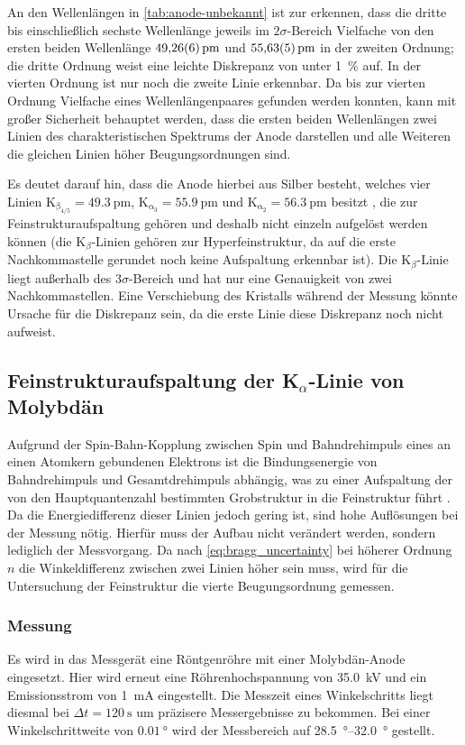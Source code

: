 An den Wellenlängen in \cref{tab:anode-unbekannt} ist zur erkennen, dass die dritte bis einschließlich 
sechste Wellenlänge jeweils im $2\sigma$-Bereich Vielfache von den ersten beiden Wellenlänge $\SI{49.26\pm 0.06}{\pm}$
und $\SI{55.63\pm 0.05}{\pm}$ in der zweiten Ordnung; die dritte Ordnung weist eine leichte Diskrepanz von 
unter \SI{1}{\percent} auf. In der vierten Ordnung ist nur noch die zweite Linie erkennbar. Da bis zur vierten 
Ordnung Vielfache eines Wellenlängenpaares gefunden werden konnten, kann mit großer Sicherheit 
behauptet werden, dass die ersten beiden Wellenlängen zwei Linien des charakteristischen Spektrums 
der Anode darstellen und alle Weiteren die gleichen Linien höher Beugungsordnungen sind.\par
Es deutet darauf hin, dass die Anode hierbei aus Silber besteht, welches 
vier Linien K$_\mathrm{\beta_{4/5}} = \SI{49.3}{\pm}$,  K$_\mathrm{\alpha_3}=\SI{55.9}{\pm}$
und K$_\mathrm{\alpha_2}=\SI{56.3}{\pm}$ besitzt \cite{nist_xray_database}, die zur Feinstrukturaufspaltung gehören und 
deshalb nicht einzeln aufgelöst werden können (die K$_\beta$-Linien gehören zur 
Hyperfeinstruktur, da auf die erste Nachkommastelle gerundet noch keine 
Aufspaltung erkennbar ist). Die K$_\beta$-Linie liegt außerhalb des $3\sigma$-Bereich und hat nur 
eine Genauigkeit von zwei Nachkommastellen. Eine Verschiebung 
des Kristalls während der Messung könnte Ursache für die Diskrepanz sein, da die erste Linie 
diese Diskrepanz noch nicht aufweist.

\subsection{Feinstrukturaufspaltung der K$_\alpha$-Linie von Molybdän}
Aufgrund der Spin-Bahn-Kopplung zwischen Spin und Bahndrehimpuls eines an einen Atomkern 
gebundenen Elektrons ist die Bindungsenergie von Bahndrehimpuls und Gesamtdrehimpuls abhängig, was 
zu einer Aufspaltung der von den Hauptquantenzahl bestimmten Grobstruktur in die Feinstruktur führt
\cite{Demtröder:829119}. Da die Energiedifferenz dieser Linien jedoch gering ist, sind hohe 
Auflösungen bei der Messung nötig. Hierfür muss der Aufbau nicht verändert werden, sondern lediglich 
der Messvorgang. Da nach \cref{eq:bragg_uncertainty} bei höherer Ordnung $n$ die Winkeldifferenz zwischen 
zwei Linien höher sein muss, wird für die Untersuchung der Feinstruktur die vierte Beugungsordnung gemessen.

\subsubsection{Messung}
Es wird in das Messgerät eine Röntgenröhre mit einer Molybdän-Anode eingesetzt. Hier wird 
erneut eine Röhrenhochspannung von \SI{35.0}{\kilo\volt} und
ein Emissionsstrom von \SI{1}{\milli\ampere} eingestellt. Die Messzeit eines Winkelschritts liegt diesmal
bei $\Delta t = \SI{120}{\second}$ um präzisere Messergebnisse zu bekommen.
Bei einer Winkelschrittweite von $\SI{0.01}{\degree}$ wird der Messbereich auf \qtyrange{28.5}{32.0}{\degree} gestellt.

